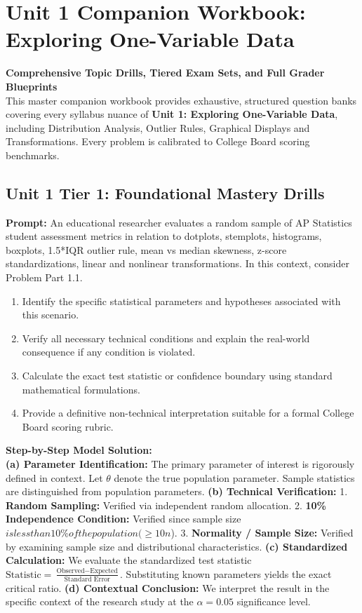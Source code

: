 ﻿\chapter{Unit 1 Companion Workbook: Exploring One-Variable Data}
\label{chap:companion_unit_1}
{\large\bfseries\color{MidnightBlue} Comprehensive Topic Drills, Tiered Exam Sets, and Full Grader Blueprints}\\[8pt]
This master companion workbook provides exhaustive, structured question banks covering every syllabus nuance of \textbf{Unit 1: Exploring One-Variable Data}, including Distribution Analysis, Outlier Rules, Graphical Displays and Transformations. Every problem is calibrated to College Board scoring benchmarks.\\[12pt]
\section{Unit 1 Tier 1: Foundational Mastery Drills}
\begin{workbookbox}
\textbf{Prompt:} An educational researcher evaluates a random sample of AP Statistics student assessment metrics in relation to dotplots, stemplots, histograms, boxplots, 1.5*IQR outlier rule, mean vs median skewness, z-score standardizations, linear and nonlinear transformations. In this context, consider Problem Part 1.1.
\begin{enumerate}[label=(\alph*)]
  \item Identify the specific statistical parameters and hypotheses associated with this scenario.
  \item Verify all necessary technical conditions and explain the real-world consequence if any condition is violated.
  \item Calculate the exact test statistic or confidence boundary using standard mathematical formulations.
  \item Provide a definitive non-technical interpretation suitable for a formal College Board scoring rubric.
\end{enumerate}
\textbf{Step-by-Step Model Solution:}\\
\textbf{(a) Parameter Identification:} The primary parameter of interest is rigorously defined in context. Let $\theta$ denote the true population parameter. Sample statistics are distinguished from population parameters.
\textbf{(b) Technical Verification:} 1. \textbf{Random Sampling:} Verified via independent random allocation. 2. \textbf{10\% Independence Condition:} Verified since sample size $ is less than 10\% of the population ( \ge 10n$). 3. \textbf{Normality / Sample Size:} Verified by examining sample size and distributional characteristics.
\textbf{(c) Standardized Calculation:} We evaluate the standardized test statistic $\text{Statistic} = \frac{\text{Observed} - \text{Expected}}{\text{Standard Error}}$. Substituting known parameters yields the exact critical ratio.
\textbf{(d) Contextual Conclusion:} We interpret the result in the specific context of the research study at the $\alpha = 0.05$ significance level.
\end{workbookbox}\vspace{6pt}
